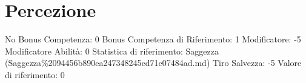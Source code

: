\section{Percezione}\label{percezione}

\begin{description}
\tightlist
\item[Tags: ABI]
No Bonus Competenza: 0 Bonus Competenza di Riferimento: 1 Modificatore:
-5 Modificatore Abilità: 0 Statistica di riferimento: Saggezza
(Saggezza\%2094456b890ea247348245cd71e07484ad.md) Tiro Salvezza: -5
Valore di riferimento: 0
\end{description}
